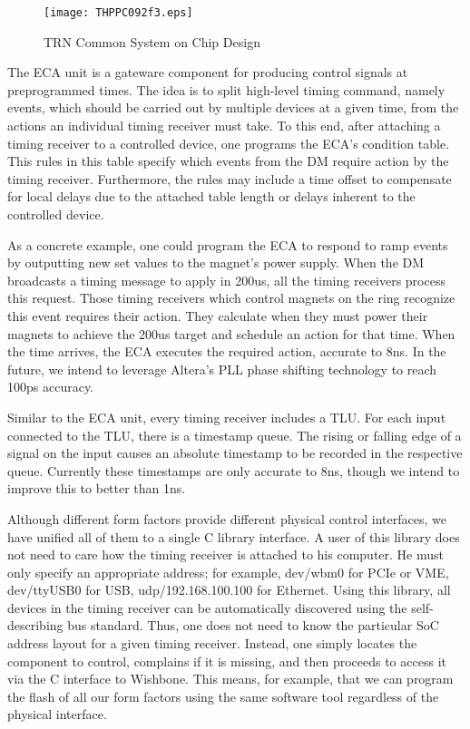 \documentclass{JAC2003}
\begin{document}
\begin{figure}[htb]
   \centering
   \texttt{[image: THPPC092f3.eps]}
   \caption{TRN Common System on Chip Design}
   \label{soc}
\end{figure}


The ECA unit is a gateware component for producing control
signals at preprogrammed times.
The idea is to split high-level timing command, namely events,
which should be carried out by multiple devices at a given time,
from the actions an individual timing receiver must take.
To this end, 
after attaching a timing receiver to a controlled device,
one programs the ECA's condition table.
This rules in this table 
specify which events from the DM
require action by the timing receiver.
Furthermore, the rules may include a time offset to compensate 
for local delays due to the attached table length or delays
inherent to the controlled device.

As a concrete example, 
one could program the ECA to respond to ramp events
by outputting new set values to the magnet's power supply.
When the DM broadcasts a timing message to apply in 200us,
all the timing receivers process this request.
Those timing receivers which control magnets on the ring
recognize this event requires their action.
They calculate when they must power their magnets to achieve
the 200us target and schedule an action for that time.
When the time arrives, the ECA executes the required action,
accurate to 8ns.
In the future,
we intend to leverage Altera's PLL phase shifting technology 
to reach 100ps accuracy.

Similar to the ECA unit,
every timing receiver includes a TLU.
For each input connected to the TLU, 
there is a timestamp queue.
The rising or falling edge of a signal on the input
causes an absolute timestamp to be recorded in the 
respective queue.
Currently these timestamps are only accurate to 8ns,
though we intend to improve this to better than 1ns.

Although different form factors provide different physical control interfaces, 
we have unified all of them to a single C library interface.
A user of this library does not need to care how the timing 
receiver is attached to his computer.
He must only specify an appropriate address;
for example,
dev/wbm0 for PCIe or VME,
dev/ttyUSB0 for USB,
udp/192.168.100.100 for Ethernet.
Using this library, all devices in the timing receiver
can be automatically discovered using the self-describing bus standard.
Thus, one does not need to know the particular SoC address layout
for a given timing receiver.
Instead, one simply locates the component to control,
complains if it is missing,
and then proceeds to access it via the C interface to Wishbone.
This means, for example, 
that we can program the flash of all our form factors using the same 
software tool regardless of the physical interface.
\end{document}
